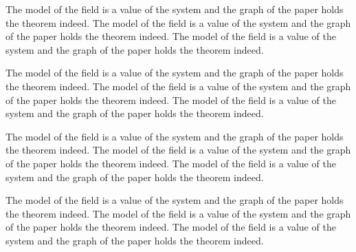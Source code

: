 \documentclass{article}
\begin{document}
The model of the field is a value of the system and the graph of the paper holds the theorem indeed. The model of the field is a value of the system and the graph of the paper holds the theorem indeed. The model of the field is a value of the system and the graph of the paper holds the theorem indeed.

The model of the field is a value of the system and the graph of the paper holds the theorem indeed. The model of the field is a value of the system and the graph of the paper holds the theorem indeed. The model of the field is a value of the system and the graph of the paper holds the theorem indeed.

The model of the field is a value of the system and the graph of the paper holds the theorem indeed. The model of the field is a value of the system and the graph of the paper holds the theorem indeed. The model of the field is a value of the system and the graph of the paper holds the theorem indeed.

The model of the field is a value of the system and the graph of the paper holds the theorem indeed. The model of the field is a value of the system and the graph of the paper holds the theorem indeed. The model of the field is a value of the system and the graph of the paper holds the theorem indeed.
\end{document}
